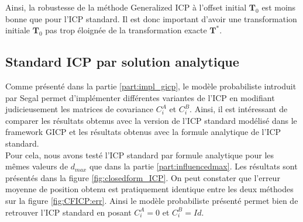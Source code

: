Ainsi, la robustesse de la méthode Generalized ICP à l'offset initial $\mathbf{T}_0$ est moins bonne que pour l'ICP standard. Il est donc important d'avoir une transformation initiale $\mathbf{T}_0$ pas trop éloignée de la transformation exacte $\mathbf{T}^*$.

\subsection{Standard ICP par solution analytique}

Comme présenté dans la partie \ref{part:impl_gicp}, le modèle probabiliste introduit par Segal permet d'implémenter différentes variantes de l'ICP en modifiant judicieusement les matrices de covariance $C_{i}^A$ et $C_{i}^B$. Ainsi, il est intéressant de comparer les résultats obtenus avec la version de l'ICP standard modélisé dans le framework GICP et les résultats obtenus avec la formule analytique de l'ICP standard. \\

Pour cela, nous avons testé l'ICP standard par formule analytique pour les mêmes valeurs de $d_{max}$ que dans la partie \ref{part:influencedmax}. Les résultats sont présentés dans la figure \ref{fig:closedform_ICP}. On peut constater que l'erreur moyenne de position obtenu est pratiquement identique entre les deux méthodes sur la figure \ref{fig:CFICP:err}. Ainsi le modèle probabiliste présenté permet bien de retrouver l'ICP standard en posant  $C_{i}^A = 0$ et $C_{i}^B = Id$.\\

